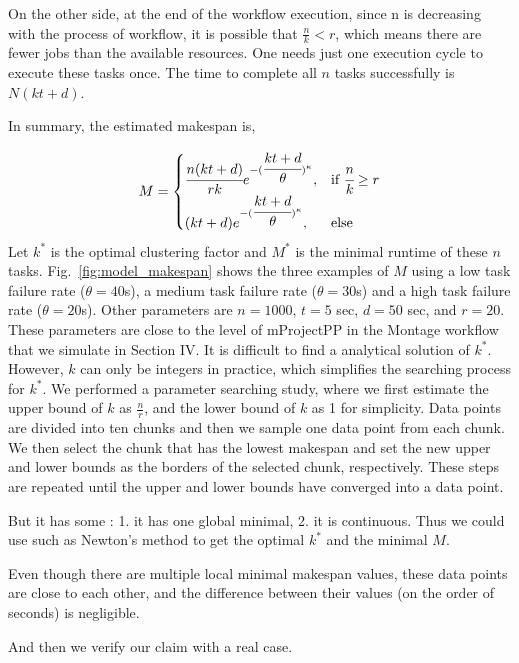 \documentclass{IOS-Book-Article}
\begin{document}
On the other side, at the end of the workflow execution, since n is decreasing with the process of workflow, it is possible that $\displaystyle \frac{n}{k} < r$, which means there are fewer jobs than the available resources. One needs just one execution cycle to execute these tasks once. The time to complete all $n$ tasks successfully is $N(kt+d)$. 

In summary, the estimated makespan is, 

\begin{equation} 
\label{eq:jfm}
M=
\begin{cases}
\cfrac{n(kt+d)}{rk}{e^{-(\cfrac{kt+d}{\theta})^{\kappa}}}, & \text{if } \cfrac{n}{k}\geq r \\
(kt+d){e^{-(\cfrac{kt+d}{\theta})^{\kappa}}}, & \text{else}
\end{cases}
\end{equation}
Let $k^*$ is the optimal clustering factor and $M^*$ is the minimal runtime of these $n$ tasks.  Fig.~\ref{fig:model_makespan} shows the three examples of $M$ using a low task failure rate ($\theta=40$s), a medium task failure rate ($\theta=30$s) and a high task failure rate ($\theta=20$s). Other parameters are $n=1000$, $t=5$ sec, $d=50$ sec, and $r=20$. These parameters are close to the level of mProjectPP in the Montage workflow that we simulate in Section IV. It is difficult to find a analytical solution of $k^*$. However, $k$ can only be integers in practice, which simplifies the searching process for $k^*$. 
We performed a parameter searching study, where we first estimate the upper bound of $k$ as $\displaystyle\frac{n}{r}$, and the lower bound of $k$ as 1 for simplicity. Data points are divided into ten chunks and then we sample one data point from each chunk. We then select the chunk that has the lowest makespan and set the new upper and lower bounds as the borders of the selected chunk, respectively. These steps are repeated until the upper and lower bounds have converged into a data point. 

But it has some : 1. it has one global minimal, 2. it is continuous. Thus we could use such as Newton's method to get the optimal $k^*$ and the minimal $M$. 

Even though there are multiple local minimal makespan values, these data points are close to each other, and the difference between their values (on the order of seconds) is negligible.

And then we verify our claim with a real case. 

\end{document}
